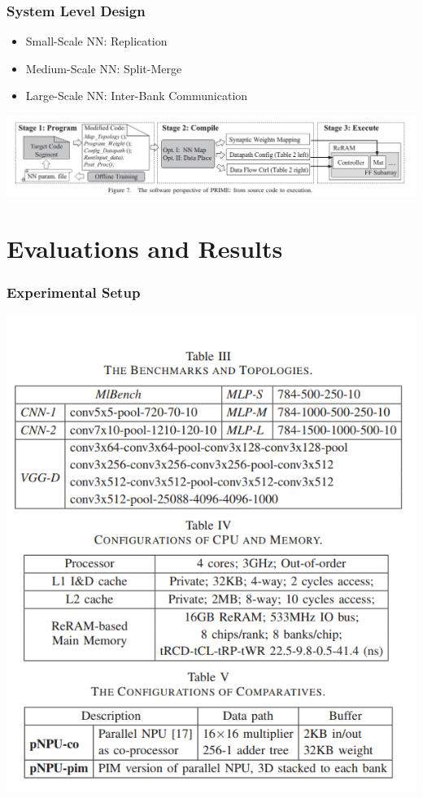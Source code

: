 \documentclass[hyperref={colorlinks}]{beamer}
\begin{document}
\begin{frame}
	\frametitle{System Level Design}
	\begin{itemize}
		\item Small-Scale NN: Replication
		\item Medium-Scale NN: Split-Merge
		\item Large-Scale NN: Inter-Bank Communication
	\end{itemize}
	\includegraphics[scale=0.25]{system_level.png}	
\end{frame}

\section{Evaluations and Results}
\begin{frame}
	\frametitle{Experimental Setup}
	\includegraphics[scale=0.3, center]{ex_setup.png}	
\end{frame}
\end{document}
